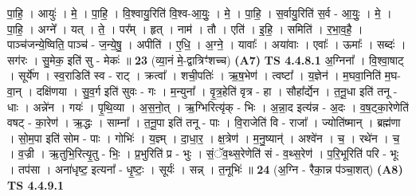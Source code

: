 \documentclass[17pt]{extarticle}
\begin{document}
                  पा॒हि॒ । आयुः॑ । मे॒ । पा॒हि॒ । वि॒श्वायु॒रिति॑ वि॒श्व-आ॒युः॒ । मे॒ । पा॒हि॒ । स॒र्वायु॒रिति॑ स॒र्व - आ॒युः॒ । मे॒ । पा॒हि॒ । अग्ने᳚ । यत् । ते॒ । पर᳚म् । हृत् । नाम॑ । तौ । एति॑ । इ॒हि॒ । समिति॑ । र॒भा॒व॒है॒ । पाञ्च॑जन्ये॒ष्विति॒ पाञ्च॑ - ज॒न्ये॒षु॒ । अपीति॑ । ए॒धि॒ । अ॒ग्ने॒ । यावाः᳚ । अया॑वाः । एवाः᳚ । ऊमाः᳚ । सब्दः॑ । सग॑रः । सु॒मेक॒ इति॑ सु - मेकः॑ ॥ \textbf{  23 } \newline
                  \newline
                      (व्या॒नं मे॒-द्वात्रिꣳ॑शच्च)  \textbf{(A7)} \newline \newline
                                \textbf{ TS 4.4.8.1} \newline
                  अ॒ग्निना᳚ । वि॒श्वा॒षाट् । सूर्ये॑ण । स्व॒राडिति॑ स्व - राट् । क्रत्वा᳚ । शची॒पतिः॑ । ऋ॒ष॒भेण॑ । त्वष्टा᳚ । य॒ज्ञेन॑ । म॒घवा॒निति॑ म॒घ-वा॒न् । दक्षि॑णया । सु॒व॒र्ग इति॑ सुवः - गः । म॒न्युना᳚ । वृ॒त्र॒हेति॑ वृत्र - हा । सौहा᳚र्द्येन । त॒नू॒धा इति॑ तनू - धाः । अन्ने॑न । गयः॑ । पृ॒थि॒व्या । अ॒स॒नो॒त् । ऋ॒ग्भिरित्यृ॑क् - भिः । अ॒न्ना॒द इत्य॑न्न - अ॒दः । व॒ष॒ट्का॒रेणेति॑ वषट् - का॒रेण॑ । ऋ॒द्धः । साम्ना᳚ । त॒नू॒पा इति॑ तनू - पाः । वि॒राजेति॑ वि - राजा᳚ । ज्योति॑ष्मान् । ब्रह्म॑णा । सो॒म॒पा इति॑ सोम - पाः । गोभिः॑ । य॒ज्ञ्म् । दा॒धा॒र॒ । क्ष॒त्रेण॑ । म॒नु॒ष्यान्॑ । अश्वे॑न । च॒ । रथे॑न । च॒ । व॒ज्री । ऋ॒तुभि॒रित्यृ॒तु - भिः॒ । प्र॒भुरिति॑ प्र - भुः । सं॒ॅव॒थ्स॒रेणेति॑ सं - व॒थ्स॒रेण॑ । प॒रि॒भूरिति॑ परि - भूः । तप॑सा । अना॑धृष्ट॒ इत्यना᳚ - धृ॒ष्टः॒ । सूर्यः॑ । सन्न् । त॒नूभिः॑ ॥ \textbf{  24} \newline
                  \newline
                      (अ॒ग्नि - रैका॒न्न प॑ञ्चा॒शत्)  \textbf{(A8)} \newline \newline
                                \textbf{ TS 4.4.9.1} \newline
\end{document}
